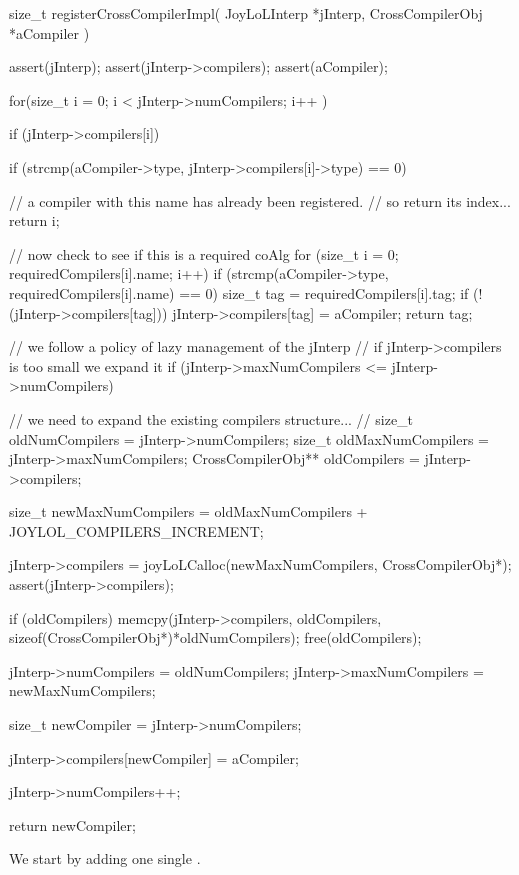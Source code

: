 \startCCode
size_t registerCrossCompilerImpl(
  JoyLoLInterp     *jInterp,
  CrossCompilerObj *aCompiler
) {
  assert(jInterp);
  assert(jInterp->compilers);
  assert(aCompiler);
  
  for(size_t i = 0; i < jInterp->numCompilers; i++ ) {
    if (jInterp->compilers[i]) {
      if (strcmp(aCompiler->type,
        jInterp->compilers[i]->type) == 0) {
    
        // a compiler with this name has already been registered. 
        // so return its index...
        return i;
      }
    }
  }

  // now check to see if this is a required coAlg
  for (size_t i = 0; requiredCompilers[i].name; i++) {
    if (strcmp(aCompiler->type, requiredCompilers[i].name) == 0) {
      size_t tag = requiredCompilers[i].tag;
      if (!(jInterp->compilers[tag])) {
        jInterp->compilers[tag] = aCompiler;
      }
      return tag;
    }
  }

  // we follow a policy of lazy management of the jInterp
  // if jInterp->compilers is too small we expand it
  if (jInterp->maxNumCompilers <= jInterp->numCompilers) {
    // we need to expand the existing compilers structure...
    //  
    size_t oldNumCompilers          = jInterp->numCompilers;
    size_t oldMaxNumCompilers       = jInterp->maxNumCompilers;
    CrossCompilerObj** oldCompilers = jInterp->compilers;
    
    size_t newMaxNumCompilers =
      oldMaxNumCompilers + JOYLOL_COMPILERS_INCREMENT;

    jInterp->compilers =
      joyLoLCalloc(newMaxNumCompilers, CrossCompilerObj*);
    assert(jInterp->compilers);
    
    if (oldCompilers) {
      memcpy(jInterp->compilers,
        oldCompilers,
        sizeof(CrossCompilerObj*)*oldNumCompilers);
      free(oldCompilers);
    }
    
    jInterp->numCompilers    = oldNumCompilers;
    jInterp->maxNumCompilers = newMaxNumCompilers;
  }
  
  size_t newCompiler = jInterp->numCompilers;
  
  jInterp->compilers[newCompiler] = aCompiler;
  
  jInterp->numCompilers++;
  
  return newCompiler;
}
\stopCCode


We start by adding one single . 

